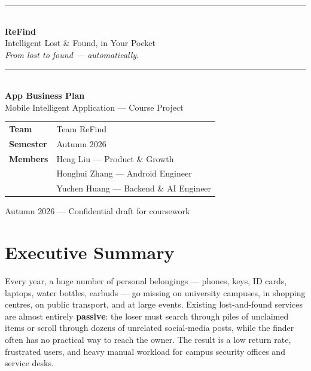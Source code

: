 \documentclass[11pt,a4paper]{article}
\newcommand{\TeamName}{Team ReFind}
\newcommand{\Semester}{Autumn 2026}
\begin{document}
\setcounter{tocdepth}{1}

\begin{titlepage}
\centering
\vspace*{1.2cm}
{\sffamily\color{brand}\rule{\textwidth}{1.5pt}}\\[6pt]
{\sffamily\Huge\bfseries\color{brand} ReFind}\\[10pt]
{\sffamily\LARGE Intelligent Lost \& Found, in Your Pocket}\\[8pt]
{\sffamily\large\color{gris} \textit{From lost to found --- automatically.}}\\[6pt]
{\sffamily\color{brand}\rule{\textwidth}{1.5pt}}\\[2.2cm]

{\sffamily\Large\bfseries App Business Plan}\\[0.4cm]
{\sffamily\large Mobile Intelligent Application --- Course Project}\\[2.4cm]

\renewcommand{\arraystretch}{1.5}
\begin{tabular}{>{\sffamily\bfseries}l l}
\toprule
Team & \TeamName \\
Semester & \Semester \\
\midrule
Members & Heng Liu --- Product \& Growth \\
        & Honghui Zhang --- Android Engineer \\
        & Yuchen Huang --- Backend \& AI Engineer \\
\bottomrule
\end{tabular}

\vfill
{\sffamily\small\color{gris}\Semester{} --- Confidential draft for coursework}
\end{titlepage}

\tableofcontents
\newpage

\section{Executive Summary}

Every year, a huge number of personal belongings --- phones, keys, ID cards, laptops, water
bottles, earbuds --- go missing on university campuses, in shopping centres, on public
transport, and at large events. Existing lost-and-found services are almost entirely
\textbf{passive}: the loser must search through piles of unclaimed items or scroll through
dozens of unrelated social-media posts, while the finder often has no practical way to reach
the owner. The result is a low return rate, frustrated users, and heavy manual workload for
campus security offices and service desks.
\end{document}
